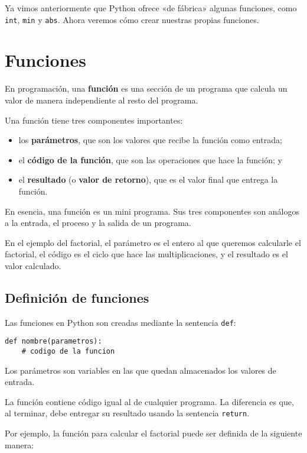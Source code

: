 Ya vimos anteriormente que Python ofrece «de fábrica» algunas funciones,
como \lstinline!int!, \lstinline!min! y \lstinline!abs!. Ahora veremos
cómo crear nuestras propias funciones.

\section{Funciones}

En programación, una \textbf{función} es una sección de un programa que
calcula un valor de manera independiente al resto del programa.

Una función tiene tres componentes importantes:

\begin{itemize}
\item
  los \textbf{parámetros}, que son los valores que recibe la función
  como entrada;
\item
  el \textbf{código de la función}, que son las operaciones que hace la
  función; y
\item
  el \textbf{resultado} (o \textbf{valor de retorno}), que es el valor
  final que entrega la función.
\end{itemize}

En esencia, una función es un mini programa. Sus tres componentes son
análogos a la entrada, el proceso y la salida de un programa.

En el ejemplo del factorial, el parámetro es el entero al que queremos
calcularle el factorial, el código es el ciclo que hace las
multiplicaciones, y el resultado es el valor calculado.

\subsection{Definición de funciones}

Las funciones en Python son creadas mediante la sentencia
\lstinline!def!:

\begin{lstlisting}
def nombre(parametros):
    # codigo de la funcion
\end{lstlisting}

Los parámetros son variables en las que quedan almacenados los valores
de entrada.

La función contiene código igual al de cualquier programa. La diferencia
es que, al terminar, debe entregar su resultado usando la sentencia
\lstinline!return!.

Por ejemplo, la función para calcular el factorial puede ser definida de
la siguiente manera:

